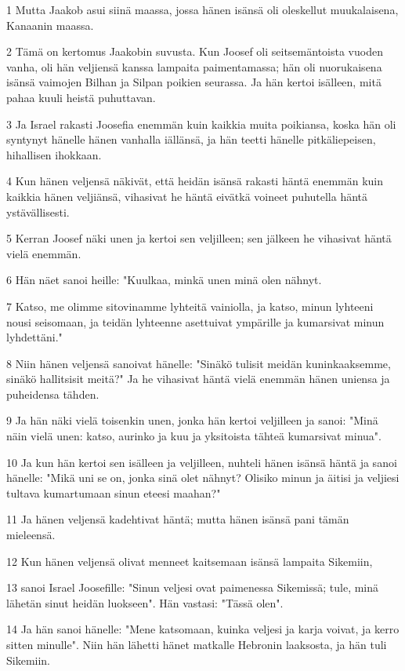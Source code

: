 \par 1 Mutta Jaakob asui siinä maassa, jossa hänen isänsä oli oleskellut muukalaisena, Kanaanin maassa.
\par 2 Tämä on kertomus Jaakobin suvusta. Kun Joosef oli seitsemäntoista vuoden vanha, oli hän veljiensä kanssa lampaita paimentamassa; hän oli nuorukaisena isänsä vaimojen Bilhan ja Silpan poikien seurassa. Ja hän kertoi isälleen, mitä pahaa kuuli heistä puhuttavan.
\par 3 Ja Israel rakasti Joosefia enemmän kuin kaikkia muita poikiansa, koska hän oli syntynyt hänelle hänen vanhalla iällänsä, ja hän teetti hänelle pitkäliepeisen, hihallisen ihokkaan.
\par 4 Kun hänen veljensä näkivät, että heidän isänsä rakasti häntä enemmän kuin kaikkia hänen veljiänsä, vihasivat he häntä eivätkä voineet puhutella häntä ystävällisesti.
\par 5 Kerran Joosef näki unen ja kertoi sen veljilleen; sen jälkeen he vihasivat häntä vielä enemmän.
\par 6 Hän näet sanoi heille: "Kuulkaa, minkä unen minä olen nähnyt.
\par 7 Katso, me olimme sitovinamme lyhteitä vainiolla, ja katso, minun lyhteeni nousi seisomaan, ja teidän lyhteenne asettuivat ympärille ja kumarsivat minun lyhdettäni."
\par 8 Niin hänen veljensä sanoivat hänelle: "Sinäkö tulisit meidän kuninkaaksemme, sinäkö hallitsisit meitä?" Ja he vihasivat häntä vielä enemmän hänen uniensa ja puheidensa tähden.
\par 9 Ja hän näki vielä toisenkin unen, jonka hän kertoi veljilleen ja sanoi: "Minä näin vielä unen: katso, aurinko ja kuu ja yksitoista tähteä kumarsivat minua".
\par 10 Ja kun hän kertoi sen isälleen ja veljilleen, nuhteli hänen isänsä häntä ja sanoi hänelle: "Mikä uni se on, jonka sinä olet nähnyt? Olisiko minun ja äitisi ja veljiesi tultava kumartumaan sinun eteesi maahan?"
\par 11 Ja hänen veljensä kadehtivat häntä; mutta hänen isänsä pani tämän mieleensä.
\par 12 Kun hänen veljensä olivat menneet kaitsemaan isänsä lampaita Sikemiin,
\par 13 sanoi Israel Joosefille: "Sinun veljesi ovat paimenessa Sikemissä; tule, minä lähetän sinut heidän luokseen". Hän vastasi: "Tässä olen".
\par 14 Ja hän sanoi hänelle: "Mene katsomaan, kuinka veljesi ja karja voivat, ja kerro sitten minulle". Niin hän lähetti hänet matkalle Hebronin laaksosta, ja hän tuli Sikemiin.
